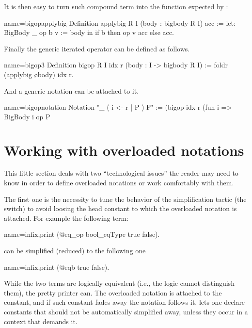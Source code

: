 It is then easy to turn such compound term into the function expected
by :

\begin{coq}{name=bigopapplybig}{}
Definition applybig {R I} (body : bigbody R I) acc :=
  let: BigBody _ op b v := body in if b then op v acc else acc.
\end{coq}

Finally the generic iterated operator can be defined as follows.

\begin{coq}{name=bigop3}{}
Definition bigop R I idx r (body : I -> bigbody R I) :=
  foldr (applybig \o body) idx r.
\end{coq}

And a generic notation can be attached to it.

\begin{coq}{name=bigopnotation}{}
Notation "\big [ op / idx ]_ ( i <- r | P ) F" :=
  (bigop idx r (fun i => BigBody i op P%
\end{coq}

\section{Working with overloaded notations}


This little section deals with two ``technological issues'' the reader
may need to know in order to define overloaded notations or work
comfortably with them.

The first one is the necessity to tune the behavior of the
simplification tactic (the \C{/=} switch) to avoid loosing the
head constant to which the overloaded notation is attached.
For example the following term:

\begin{coq}{name=infix,print}{}
  (@eq_op bool_eqType true false).
\end{coq}
can be simplified (reduced) to the following one

\begin{coq}{name=infix,print}{}
  (@eqb true false).
\end{coq}

While the two terms are logically equivalent (i.e., the logic cannot
distinguish them), the pretty printer can.  The overloaded
\C{==} notation is attached to the  constant, and if such
constant fades away the notation follows it.  \Coq{} lets one declare
constants that should not be automatically simplified away, unless
they occur in a context that demands it.

